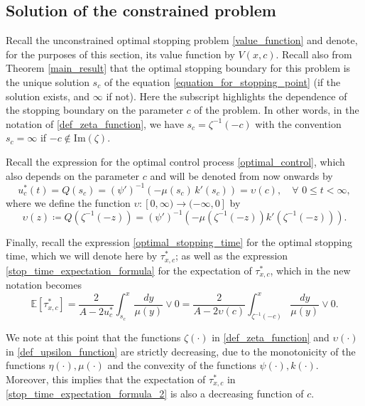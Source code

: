 \documentclass[11pt,tbtags,reqno]{article}
\theoremstyle{definition}
\numberwithin{equation}{section}
\theoremstyle{definition}
\begin{document}
\subsection{Solution of the constrained problem}

Recall the unconstrained optimal stopping problem \eqref{value_function} and denote, for the purposes of this section, its value function by $V(x, c)$. Recall also from Theorem \ref{main_result} that the optimal stopping boundary for this problem is the unique solution $s_c$ of the equation \eqref{equation_for_stopping_point} (if the solution exists, and $\infty$ if not). Here the subscript highlights the dependence of the stopping boundary on the parameter $c$ of the problem. In other words, in the notation of \eqref{def_zeta_function}, we have $s_c = \zeta^{-1}(-c)$ with the convention $s_c = \infty$ if $-c \notin \text{Im}(\zeta)$.

Recall the expression for the optimal control process \eqref{optimal_control}, which also depends on the parameter $c$ and will be denoted from now onwards by
\begin{equation}\label{optimal_control_2}
    u^*_c(t) = Q(s_c) = \left(\psi'\right)^{-1}\left(-\mu(s_c)\, k'(s_c) \right) = \upsilon(c), \quad \forall \,\, 0 \le t < \infty,
\end{equation}
where we define the function $\upsilon: [0, \infty) \to (-\infty, 0]$ by 
\begin{equation}\label{def_upsilon_function}
    \upsilon(z) \coloneqq Q(\zeta^{-1}(-z)) = \left(\psi'\right)^{-1}\left(-\mu\left(\zeta^{-1}(-z)\right) k'\left(\zeta^{-1}(-z)\right)\right).
\end{equation}

Finally, recall the expression \eqref{optimal_stopping_time} for the optimal stopping time, which we will denote here by $\tau^*_{x, c}$; as well as the expression \eqref{stop_time_expectation_formula} for the expectation of $\tau^*_{x, c}$, which in the new notation becomes
\begin{equation}\label{stop_time_expectation_formula_2}
    \mathbb{E}\left[\tau^*_{x, c}\right] 
    =
    \frac{2}{A - 2u^*_c}\int_{s_c}^x \frac{dy}{\mu(y)} \vee 0
    = 
    \frac{2}{A - 2\upsilon(c)}\int_{\zeta^{-1}(-c)}^x \frac{dy}{\mu(y)} \vee 0.
\end{equation}

We note at this point that the functions $\zeta(\cdot)$ in \eqref{def_zeta_function} and $\upsilon(\cdot)$ in \eqref{def_upsilon_function} are strictly decreasing, due to the monotonicity of the functions $\eta(\cdot), \mu(\cdot)$ and the convexity of the functions $\psi(\cdot), k(\cdot)$. Moreover, this implies that the expectation of $\tau^*_{x, c}$ in \eqref{stop_time_expectation_formula_2} is also a decreasing function of $c$.
\end{document}
